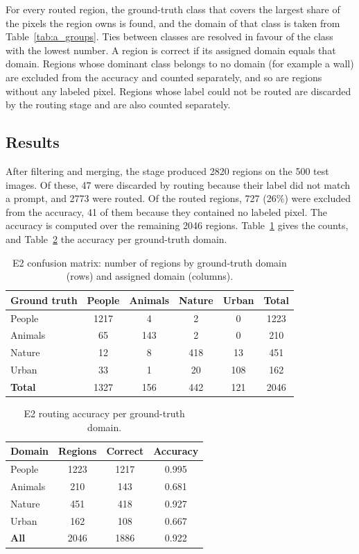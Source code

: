 \documentclass{FastFyp}
\begin{document}
For every routed region, the ground-truth class that covers the largest share of the pixels the region owns is found, and the domain of that class is taken from Table~\ref{tab:a_groups}. Ties between classes are resolved in favour of the class with the lowest number. A region is correct if its assigned domain equals that domain. Regions whose dominant class belongs to no domain (for example a wall) are excluded from the accuracy and counted separately, and so are regions without any labeled pixel. Regions whose label could not be routed are discarded by the routing stage and are also counted separately.
 
\subsection{Results}
After filtering and merging, the stage produced 2820 regions on the 500 test images. Of these, 47 were discarded by routing because their label did not match a prompt, and 2773 were routed. Of the routed regions, 727 (26\%) were excluded from the accuracy, 41 of them because they contained no labeled pixel. The accuracy is computed over the remaining 2046 regions. Table~\ref{tab:a_e2_conf} gives the counts, and Table~\ref{tab:a_e2_acc} the accuracy per ground-truth domain.
 
\begin{table}[!ht]
\centering
\caption{E2 confusion matrix: number of regions by ground-truth domain (rows) and assigned domain (columns).}
\label{tab:a_e2_conf}
\begin{tabular}{|l|c|c|c|c|c|}
\hline
\textbf{Ground truth} & \textbf{People} & \textbf{Animals} & \textbf{Nature} & \textbf{Urban} & \textbf{Total} \\ \hline
People & 1217 & 4 & 2 & 0 & 1223 \\ \hline
Animals & 65 & 143 & 2 & 0 & 210 \\ \hline
Nature & 12 & 8 & 418 & 13 & 451 \\ \hline
Urban & 33 & 1 & 20 & 108 & 162 \\ \hline
\textbf{Total} & 1327 & 156 & 442 & 121 & 2046 \\ \hline
\end{tabular}
\end{table}
 
\begin{table}[!ht]
\centering
\caption{E2 routing accuracy per ground-truth domain.}
\label{tab:a_e2_acc}
\begin{tabular}{|l|c|c|c|}
\hline
\textbf{Domain} & \textbf{Regions} & \textbf{Correct} & \textbf{Accuracy} \\ \hline
People & 1223 & 1217 & 0.995 \\ \hline
Animals & 210 & 143 & 0.681 \\ \hline
Nature & 451 & 418 & 0.927 \\ \hline
Urban & 162 & 108 & 0.667 \\ \hline
\textbf{All} & 2046 & 1886 & 0.922 \\ \hline
\end{tabular}
\end{table}
 
\end{document}
